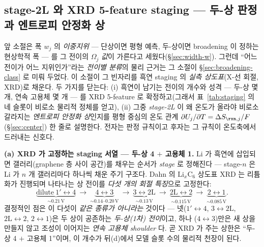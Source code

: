 \subsection{stage-2L 와 XRD 5-feature staging --- 두-상 판정과 엔트로피 안정화 상}\label{sec:gr-2L}
앞 소절은 폭 $w_j$ 의 \emph{이중지위} --- 단상이면 평형 예측, 두-상이면 broadening 이 정하는 현상학적 폭 ---
를 그 전이의 $\Omega_j$ \emph{값}이 가른다고 세웠다(\S\ref{sec:width-w}). 그런데 ``어느 전이가 어느 지위인가''라는
\emph{전이별 분류}의 물리 근거는 그 소절이 \S\ref{sec:broadening-class} 로 미뤄 두었다. 이 소절이 그 빈자리를
흑연 staging 의 \emph{실측 상도표}(X-선 회절, XRD)로 채운다. 두 가지를 닫는다: (i) 흑연이 남기는 전이의 개수와
성격 --- 두-상 몇 개, 연속 고용체 몇 개 --- 를 XRD 5-feature 로 확정하고(그래서 표~\ref{tab:staging} 의 네 슬롯이
비로소 물리적 정체를 얻고), (ii) 그중 \emph{stage-2L} 이 왜 온도가 올라야 비로소 갈라지는 \emph{엔트로피 안정화
상}인지를 평형 중심의 온도 관계 $\partial U_j/\partial T=\Delta S_{\rxn,j}/F$(\S\ref{sec:center}) 한 줄로 설명한다.
전자는 판정 규칙이고 후자는 그 규칙이 온도축에서 드러내는 신호다.

\textbf{(a) XRD 가 고정하는 staging 서열 --- 두-상 4 $+$ 고용체 1.} Li 가 흑연에 삽입되면 갤러리(graphene 층
사이 공간)를 채우는 순서가 \emph{stage} 로 정해진다 --- stage-$n$ 은 Li 가 $n$ 개 갤러리마다 하나씩 채운 주기
구조다. Dahn 의 $\mathrm{Li}_x\mathrm{C_6}$ 상도표 XRD\cite{dahn1991} 는 리튬화가 진행되며 나타나는 상
전이를 \emph{다섯 개의 회절 특징}으로 고정한다:
\begin{equation}
\underbrace{\text{dilute}\ 1'\!\leftrightarrow\!4}_{\sim0.21\,\mathrm V}\ \to\
\underbrace{4\!\leftrightarrow\!3}_{\sim0.14\text{--}0.20\,\mathrm V}\ \to\
\underbrace{3\!\leftrightarrow\!2\mathrm L}_{\sim0.13\,\mathrm V}\ \to\
\underbrace{2\mathrm L\!\leftrightarrow\!2}_{\sim0.115\,\mathrm V}\ \to\
\underbrace{2\!\leftrightarrow\!1}_{\sim0.085\,\mathrm V}.
\label{eq:gr-xrdseq}
\end{equation}
결정적인 점은 이 다섯이 \emph{같은 종류가 아니라는} 것이다 --- 넷($1'\!\leftrightarrow\!4$, $3\!\leftrightarrow\!2\mathrm L$,
$2\mathrm L\!\leftrightarrow\!2$, $2\!\leftrightarrow\!1$)은 두 상이 공존하는 \emph{두-상(1차) 전이}이고, 하나
($4\!\leftrightarrow\!3$)만은 새 상을 만들지 않고 조성이 이어지는 \emph{연속 고용체 shoulder} 다\cite{dahn1991}.
곧 XRD 가 주는 상한은 ``두-상 4 $+$ 고용체 1''이며, 이 개수가 뒤(d)에서 모델 슬롯 수의 물리적 천장이 된다.

